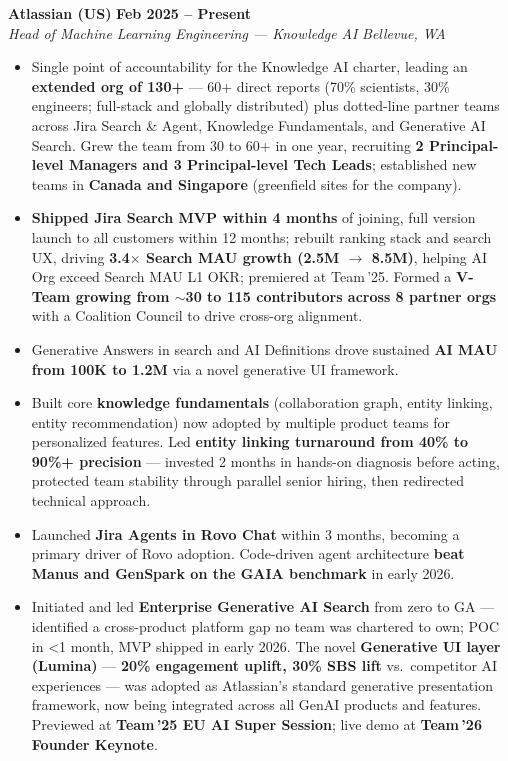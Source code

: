 \documentclass[10.5pt,letterpaper]{article}
\newcommand{\role}[4]{%
  \noindent\textbf{#1} \hfill \textbf{#3}\\
  \textit{#2} \hfill \textit{#4}\par\vspace{2pt}}
\begin{document}
\role{Atlassian (US)}{Head of Machine Learning Engineering --- Knowledge AI}{Feb 2025 -- Present}{Bellevue, WA}
\begin{itemize}
  \item Single point of accountability for the Knowledge AI charter, leading an \textbf{extended org of 130+} — 60+ direct reports (70\% scientists, 30\% engineers; full-stack and globally distributed) plus dotted-line partner teams across Jira Search \& Agent, Knowledge Fundamentals, and Generative AI Search. Grew the team from 30 to 60+ in one year, recruiting \textbf{2 Principal-level Managers and 3 Principal-level Tech Leads}; established new teams in \textbf{Canada and Singapore} (greenfield sites for the company).
  \item \textbf{Shipped Jira Search MVP within 4 months} of joining, full version launch to all customers within 12 months; rebuilt ranking stack and search UX, driving \textbf{3.4$\times$ Search MAU growth (2.5M $\to$ 8.5M)}, helping AI Org exceed Search MAU L1 OKR; premiered at Team\,'25. Formed a \textbf{V-Team growing from $\sim$30 to 115 contributors across 8 partner orgs} with a Coalition Council to drive cross-org alignment.
  \item Generative Answers in search and AI Definitions drove sustained \textbf{AI MAU from 100K to 1.2M} via a novel generative UI framework.
  \item Built core \textbf{knowledge fundamentals} (collaboration graph, entity linking, entity recommendation) now adopted by multiple product teams for personalized features. Led \textbf{entity linking turnaround from 40\% to 90\%+ precision} — invested 2 months in hands-on diagnosis before acting, protected team stability through parallel senior hiring, then redirected technical approach.
  \item Launched \textbf{Jira Agents in Rovo Chat} within 3 months, becoming a primary driver of Rovo adoption. Code-driven agent architecture \textbf{beat Manus and GenSpark on the GAIA benchmark} in early 2026.
  \item Initiated and led \textbf{Enterprise Generative AI Search} from zero to GA — identified a cross-product platform gap no team was chartered to own; POC in <1 month, MVP shipped in early 2026. The novel \textbf{Generative UI layer (Lumina)} — \textbf{20\% engagement uplift, 30\% SBS lift} vs.\ competitor AI experiences — was adopted as Atlassian's standard generative presentation framework, now being integrated across all GenAI products and features. Previewed at \textbf{Team\,'25 EU AI Super Session}; live demo at \textbf{Team\,'26 Founder Keynote}.
\end{itemize}
\end{document}
